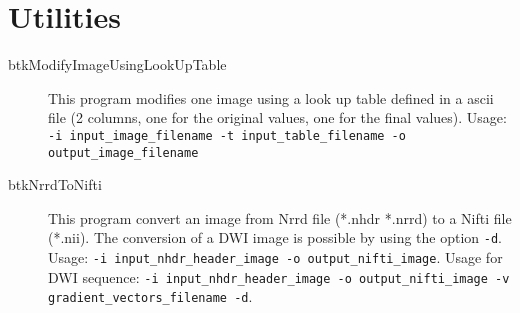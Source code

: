 \section{Utilities}


\begin{description}
  \item[btkModifyImageUsingLookUpTable] This program modifies one image using a look up table defined in a ascii file (2 columns, one for the original values, one for the final values). Usage: \texttt{-i input\_image\_filename -t input\_table\_filename -o output\_image\_filename}
  \item[btkNrrdToNifti] This program convert an image from Nrrd file (*.nhdr *.nrrd) to a Nifti file (*.nii). The conversion of a DWI image is possible by using the option \texttt{-d}. Usage: \texttt{-i input\_nhdr\_header\_image -o output\_nifti\_image}. Usage for DWI sequence: \texttt{-i input\_nhdr\_header\_image -o output\_nifti\_image -v gradient\_vectors\_filename -d}.
\end{description}
